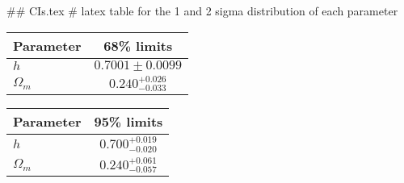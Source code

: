 ## CIs.tex
# latex table for the 1 and 2 sigma distribution of each parameter

\begin{tabular} { l  c}
 Parameter &  68\% limits\\
\hline
{\boldmath$h              $} & $0.7001\pm 0.0099          $\\
{\boldmath$\Omega_m       $} & $0.240^{+0.026}_{-0.033}   $\\
\hline
\end{tabular}

\begin{tabular} { l  c}
 Parameter &  95\% limits\\
\hline
{\boldmath$h              $} & $0.700^{+0.019}_{-0.020}   $\\
{\boldmath$\Omega_m       $} & $0.240^{+0.061}_{-0.057}   $\\
\hline
\end{tabular}
